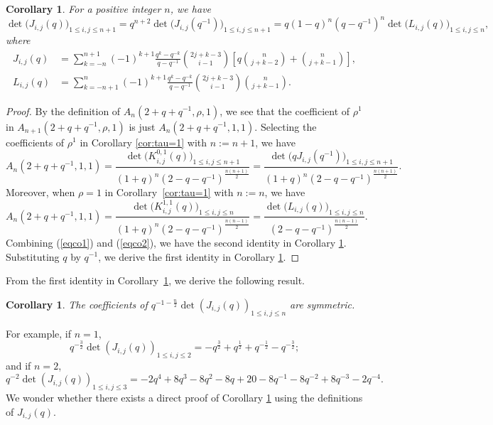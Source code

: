 \documentclass[12pt, a4paper]{amsart} %
\numberwithin{equation}{section}
\newtheorem{corollary}[theorem]{Corollary}
\begin{document}
\begin{corollary}\label{cor:JRL}
	For a positive integer $n$, we have
\begin{equation*}
	\det\bigl( J_{i,j}(q) \bigr)_{1 \le i,j \le n+1} 
	= q^{n+2} \det\bigl(  J_{i,j}(q^{-1} )\bigr)_{1 \le i,j \le n+1} 
	= q (1-q)^n(q-q^{-1})^n \det\bigl( L_{i,j}(q) \bigr)_{1 \le i,j \le n},
\end{equation*}
where
\begin{align*}
	J_{i,j}(q) &= \sum_{k=-n}^{n+1} (-1)^{k+1} \frac{q^k - q^{-k}}{q - q^{-1}} 
\binom{2j + k - 3}{i - 1} 
\left[ q \binom{n}{j + k - 2} + \binom{n}{j + k - 1} \right], \\
	L_{i,j}(q) &= \sum_{k=-n+1}^{n} (-1)^{k+1} \frac{q^k - q^{-k}}{q - q^{-1}} 
\binom{2j + k - 3}{i - 1} 
\binom{n}{j + k - 1}.
\end{align*}
\end{corollary}


\begin{proof} By the definition of $A_{n}(2+q+q^{-1},\rho,1)$, we see that the coefficient of $\rho^1$ 
	in $A_{n+1}(2+q+q^{-1},\rho,1)$ is just $A_{n}(2+q+q^{-1},1,1)$. 
	Selecting the coefficients of $\rho^1$ in  Corollary \ref{cor:tau=1} with $n:=n+1$, we have
\begin{equation}\label{eqco1}
	A_{n}(2+q+q^{-1},1,1) = \frac{\det\bigl(  K^{0,1}_{i,j}(q) \bigr)_{1 \le i,j \le n+1}}{(1+q)^n(2-q-q^{-1})^{\frac{n(n+1)}{2}}}
	 = \frac{\det\bigl( q J_{i,j}(q^{-1}) \bigr)_{1 \le i,j \le n+1}}{(1+q)^n(2-q-q^{-1})^{\frac{n(n+1)}{2}}}. 
\end{equation}
Moreover, when $\rho=1$ in Corollary~\ref{cor:tau=1} with $n:=n$, we have
 \begin{equation}\label{eqco2}
    A_{n}(2+q+q^{-1},1,1)
	 = \frac{ \det\bigl( K^{1,1}_{i,j}(q) \bigr)_{1 \le i,j \le n}}{(1+q)^n(2-q-q^{-1})^{\frac{n(n-1)}{2}}}
	 = \frac{\det\bigl( L_{i,j}(q) \bigr)_{1 \le i,j \le n}}{(2-q-q^{-1})^{\frac{n(n-1)}{2}}}.
 \end{equation}
	Combining (\ref{eqco1}) and (\ref{eqco2}), we have the second identity in Corollary \ref{cor:JRL}. 
	Substituting $q$ by $q^{-1}$, we derive the first identity in Corollary \ref{cor:JRL}. 
\end{proof}



From the first identity in Corollary~\ref{cor:JRL}, we derive the following result.
\begin{corollary}\label{cor:sym}
	The coefficients of $q^{-1-\frac{n}{2}}\det{\left(J_{i,j}(q)\right)_{1 \le i,j \le n}}$ are symmetric. 
\end{corollary}
For example, if $n=1$,
$$
q^{-\frac{3}{2}} \det(J_{i,j}(q))_{1\leq i, j\leq 2} = 
-q^{\frac32} + q^{\frac12}
+ q^{-\frac12} -q^{-\frac32};
$$
and if $n=2$,
$$
q^{-2}\det{\left(J_{i,j}(q)\right)_{1 \le i,j \le 3}}= -2q^4+8q^3-8q^2-8q+20-8q^{-1}-8q^{-2}+8q^{-3}-2q^{-4}.
$$
We wonder whether there exists a direct proof of Corollary \ref{cor:sym} using the definitions of $J_{i,j}(q)$.
\end{document}
